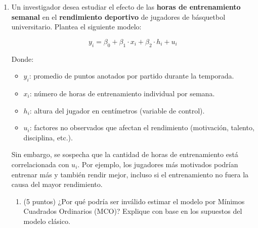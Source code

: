 \documentclass[10pt,a4paper]{article}
\begin{document}
\begin{enumerate}
 \item Un investigador desea estudiar el efecto de las \textbf{horas de entrenamiento semanal} en el \textbf{rendimiento deportivo} de jugadores de básquetbol universitario. Plantea el siguiente modelo:

 
\[
y_i = \beta_0 + \beta_1 \cdot x_i + \beta_2 \cdot h_i + u_i
\]

Donde:
\begin{itemize}
    \item $y_i$: promedio de puntos anotados por partido durante la temporada.
    \item $x_i$: número de horas de entrenamiento individual por semana. 
    \item $h_i$: altura del jugador en centímetros (variable de control). 
    \item $u_i$: factores no observados que afectan el rendimiento (motivación, talento, disciplina, etc.).
\end{itemize}



Sin embargo, se sospecha que la cantidad de horas de entrenamiento está correlacionada con $u_i$. Por ejemplo, los jugadores más motivados podrían entrenar más y también rendir mejor, incluso si el entrenamiento no fuera la causa del mayor rendimiento.


\begin{enumerate}
    \item (5 puntos) ¿Por qué podría ser inválido estimar el modelo por Mínimos Cuadrados Ordinarios (MCO)? Explique con base en los supuestos del modelo clásico.\\



\end{enumerate}
\end{enumerate}
\end{document}
